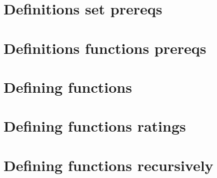 \section*{Definitions set prereqs}

\vfill
\section*{Definitions functions prereqs}

\vfill
\section*{Defining functions}

\vfill
\section*{Defining functions ratings}

\vfill
\section*{Defining functions recursively}

\vfill

